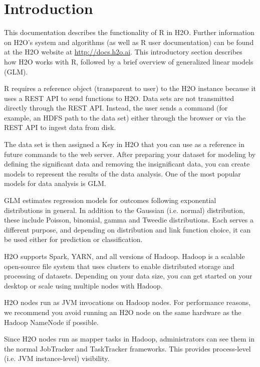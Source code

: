 \newpage
\tableofcontents



\section{Introduction}

This documentation describes the functionality of R in H2O. Further information on H2O's system and algorithms (as well as R user documentation) can be found at the H2O website at {\url{http://docs.h2o.ai}}. This introductory section describes how H2O works with R, followed by a brief overview of generalized linear models (GLM). 

R requires a reference object (transparent to user) to the H2O instance because it uses a REST API to send functions to H2O. Data sets are not transmitted directly through the REST API. Instead, the user sends a command (for example, an HDFS path to the data set) either through the browser or via the REST API to ingest data from disk.

The data set is then assigned a Key in H2O that you can use as a reference in future commands to the web server. After preparing your dataset for modeling by defining the significant data and removing the insignificant data, you can create models to represent the results of the data analysis. One of the most popular models for data analysis is GLM. 

GLM estimates regression models for outcomes following exponential distributions in general. In addition to the Gaussian (i.e. normal) distribution, these include Poisson, binomial, gamma and Tweedie distributions. Each serves a different purpose, and depending on distribution and link function choice, it can be used either for prediction or classification.

H2O supports Spark, YARN, and all versions of Hadoop. Hadoop is a scalable open-source file system that uses clusters to enable distributed storage and processing of datasets. Depending on your data size, you can get started on your desktop or scale using multiple nodes with Hadoop. 

H2O nodes run as JVM invocations on Hadoop nodes. For performance reasons, we recommend you avoid running an H2O node on the same hardware as the Hadoop NameNode if possible.

Since H2O nodes run as mapper tasks in Hadoop, administrators can see them in the normal JobTracker and TaskTracker frameworks. This provides process-level (i.e. JVM instance-level) visibility.

